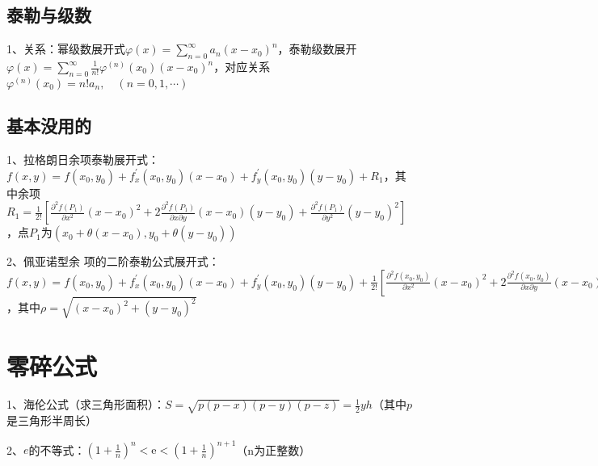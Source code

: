 \subsection{泰勒与级数}

1、关系：幂级数展开式$ \varphi(x)=\sum_{n=0}^{\infty} a_{n}\left(x-x_{0}\right)^{n} $，泰勒级数展开$ \varphi(x)=\sum_{n=0}^{\infty} \frac{1}{n !} \varphi^{(n)}\left(x_{0}\right)\left(x-x_{0}\right)^{n} $，对应关系$ \varphi^{(n)}\left(x_{0}\right)=n ! a_{n}, \quad(n=0,1, \cdots) $



\subsection{基本没用的}

1、拉格朗日余项泰勒展开式：$ f(x, y)=f\left(x_{0}, y_{0}\right)+f_{x}^{\prime}\left(x_{0}, y_{0}\right)\left(x-x_{0}\right)+f_{y}^{\prime}\left(x_{0}, y_{0}\right)\left(y-y_{0}\right)+R_{1} $，其中余项$ R_{1}=\frac{1}{2 !}\left[\frac{\partial^{2} f\left(P_{1}\right)}{\partial x^{2}}\left(x-x_{0}\right)^{2}+2 \frac{\partial^{2} f\left(P_{1}\right)}{\partial x \partial y}\left(x-x_{0}\right)\left(y-y_{0}\right)+\frac{\partial^{2} f\left(P_{1}\right)}{\partial y^{2}}\left(y-y_{0}\right)^{2}\right] $，点$ P_{1} $为$ \left(x_{0}+\theta\left(x-x_{0}\right), y_{0}+\theta\left(y-y_{0}\right)\right) $

2、佩亚诺型余 项的二阶泰勒公式展开式：$ f(x, y)=f\left(x_{0}, y_{0}\right)+f_{x}^{\prime}\left(x_{0}, y_{0}\right)\left(x-x_{0}\right)+f_{y}^{\prime}\left(x_{0}, y_{0}\right)\left(y-y_{0}\right)+\frac{1}{2 !}[\frac{\partial^{2} f\left(x_{0}, y_{0}\right)}{\partial x^{2}}\left(x-x_{0}\right)^{2}+2 \frac{\partial^{2} f\left(x_{0}, y_{0}\right)}{\partial x \partial y}\left(x-x_{0}\right)\left(y-y_{0}\right)+\frac{\partial^{2} f\left(x_{0}, y_{0}\right)}{\partial y^{2}}\left(y-y_{0}\right)^{2}]+o\left(\rho^{2}\right) $，其中$ \rho=\sqrt{\left(x-x_{0}\right)^{2}+\left(y-y_{0}\right)^{2}} $

\section{零碎公式}

1、海伦公式（求三角形面积）：$ S=\sqrt{p(p-x)(p-y)(p-z)}=\frac{1}{2} y h $（其中$ p $是三角形半周长）

2、$ e $的不等式：$ \left(1+\frac{1}{n}\right)^{n}<\mathrm{e}<\left(1+\frac{1}{n}\right)^{n+1} $（n为正整数）

